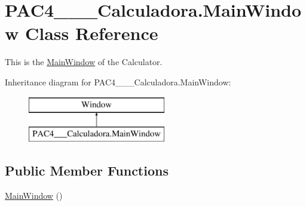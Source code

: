 \hypertarget{class_p_a_c4_______calculadora_1_1_main_window}{}\section{P\+A\+C4\+\_\+\+\_\+\+\_\+\+Calculadora.\+Main\+Window Class Reference}
\label{class_p_a_c4_______calculadora_1_1_main_window}


This is the \mbox{\hyperlink{class_p_a_c4_______calculadora_1_1_main_window}{Main\+Window}} of the Calculator.  


Inheritance diagram for P\+A\+C4\+\_\+\+\_\+\+\_\+\+Calculadora.\+Main\+Window\+:\begin{figure}[H]
\begin{center}
\leavevmode
\includegraphics[height=2.000000cm]{class_p_a_c4_______calculadora_1_1_main_window}
\end{center}
\end{figure}
\subsection*{Public Member Functions}
\begin{DoxyCompactItemize}
\item 
\mbox{\hyperlink{class_p_a_c4_______calculadora_1_1_main_window_a3c32f82d8171e5b7b00a5d78c1caad05}{Main\+Window}} ()
\end{DoxyCompactItemize}
